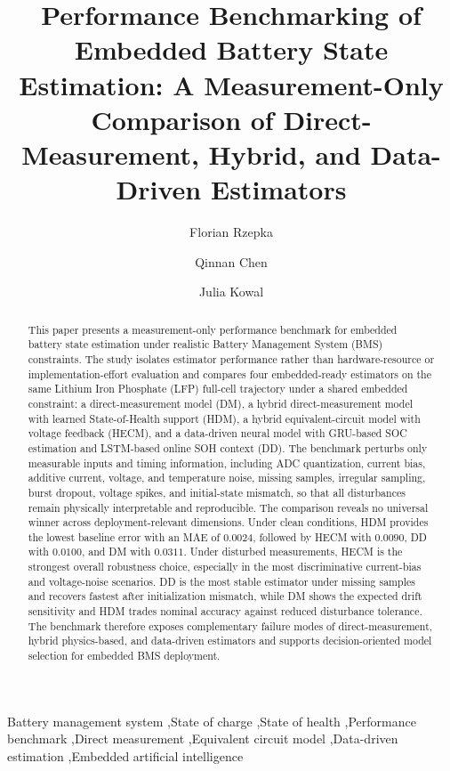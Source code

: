 \documentclass[review,nopreprintline]{elsarticle}
\date{}
\begin{document}
\begin{frontmatter}
\title{Performance Benchmarking of Embedded Battery State Estimation: A Measurement-Only Comparison of Direct-Measurement, Hybrid, and Data-Driven Estimators}
\author[1]{Florian Rzepka}
\author[1]{Qinnan Chen}
\author[1]{Julia Kowal}
\begin{abstract}
This paper presents a measurement-only performance benchmark for embedded battery state estimation under realistic Battery Management System (BMS) constraints. The study isolates estimator performance rather than hardware-resource or implementation-effort evaluation and compares four embedded-ready estimators on the same Lithium Iron Phosphate (LFP) full-cell trajectory under a shared embedded constraint: a direct-measurement model (DM), a hybrid direct-measurement model with learned State-of-Health support (HDM), a hybrid equivalent-circuit model with voltage feedback (HECM), and a data-driven neural model with GRU-based SOC estimation and LSTM-based online SOH context (DD). The benchmark perturbs only measurable inputs and timing information, including ADC quantization, current bias, additive current, voltage, and temperature noise, missing samples, irregular sampling, burst dropout, voltage spikes, and initial-state mismatch, so that all disturbances remain physically interpretable and reproducible. The comparison reveals no universal winner across deployment-relevant dimensions. Under clean conditions, HDM provides the lowest baseline error with an MAE of $0.0024$, followed by HECM with $0.0090$, DD with $0.0100$, and DM with $0.0311$. Under disturbed measurements, HECM is the strongest overall robustness choice, especially in the most discriminative current-bias and voltage-noise scenarios. DD is the most stable estimator under missing samples and recovers fastest after initialization mismatch, while DM shows the expected drift sensitivity and HDM trades nominal accuracy against reduced disturbance tolerance. The benchmark therefore exposes complementary failure modes of direct-measurement, hybrid physics-based, and data-driven estimators and supports decision-oriented model selection for embedded BMS deployment.
\end{abstract}
\begin{keyword}
Battery management system \sep State of charge \sep State of health \sep Performance benchmark \sep Direct measurement \sep Equivalent circuit model \sep Data-driven estimation \sep Embedded artificial intelligence
\end{keyword}
\end{frontmatter}
\linenumbers
\end{document}
